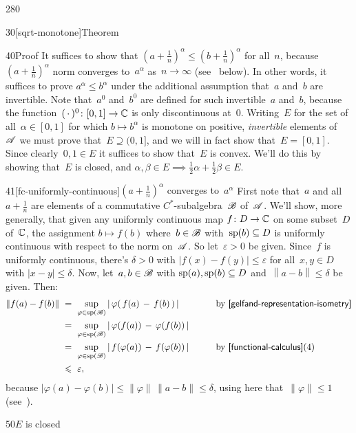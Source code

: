 \begin{parsec}{280}
\begin{point}{30}[sqrt-monotone]{Theorem}
\begin{point}{40}{Proof}
It suffices to show that
$(a+\frac{1}{n})^\alpha \leq (b+\frac{1}{n})^\alpha$
for all~$n$,
because~$(a+\frac{1}{n})^\alpha$
norm converges to~$a^\alpha$
as~$n\to\infty$ (see~ below).
In other words,
it suffices to prove $a^\alpha \leq b^\alpha$
under the additional assumption that~$a$ and~$b$ are invertible.
Note that~$a^0$ and~$b^0$ are defined for such
invertible~$a$ and~$b$,
because the
function~$(\,\cdot\,)^0\colon [0,1]\to\mathbb{C}$
is only discontinuous at~$0$.
Writing~$E$ for the set of all~$\alpha\in[0,1]$
for which $b\mapsto b^\alpha$ is monotone
on positive,
\emph{invertible} elements of~$\mathscr{A}$
we must prove that~$E\supseteq(0,1]$,
and we will in fact show that~$E=[0,1]$.
Since clearly~$0,1\in E$
it suffices to show that~$E$ is convex.
We'll do this by showing that~$E$
is closed,
and $\alpha,\beta\in E\implies \frac{1}{2}\alpha
+ \frac{1}{2}\beta \in E$.
\begin{point}{41}[fc-uniformly-continuous]{$(a+\frac{1}{n})^\alpha$
	converges to~$a^\alpha$}
First note that~$a$ and all~$a+\frac{1}{n}$
are elements of a commutative $C^*$-subalgebra~$\mathscr{B}$
of~$\mathscr{A}$.
We'll show, more generally,
that given any uniformly continuous map $f\colon D\to\mathbb{C}$
on some subset~$D$ of~$\mathbb{C}$,
the assignment $b\mapsto f(b)$
where~$b\in \mathscr{B}$ with~$\mathrm{sp}(b)\subseteq D$
is uniformly continuous
with respect to the norm on~$\mathscr{A}$.
So let~$\varepsilon>0$ be given.
Since~$f$ is uniformly continuous,
there's $\delta>0$ with $\left|f(x)-f(y)\right|\leq\varepsilon$
for all~$x,y\in D$ with $\left|x-y\right|\leq \delta$.
Now, let~$a,b\in \mathscr{B}$ with
$\mathrm{sp}(a),\mathrm{sp}(b)\subseteq D$
and~$\left\|a-b\right\|\leq \delta$ be given. Then:
\begin{alignat*}{3}
\|f(a)-f(b)\|
\ &= \ \sup_{\varphi\in \spec(\scrB)}
\left|\,\varphi(\,f(a)\,-\,f(b)\,)\,\right|\qquad
&&\text{by~\sref{gelfand-representation-isometry}}
\\
\ &=\ \sup_{\varphi\in\spec(\scrB)}\left|
\,\varphi(f(a))\,-\,\varphi(f(b))\,\right|\qquad
&&
\\
\ &=\ \sup_{\varphi\in\spec(\scrB)}\left|
\,f(\varphi(a))\,-\,f(\varphi(b))\,\right|\qquad
&&\text{by~\sref{functional-calculus}(4)}
\\
\ &\leq\ \varepsilon,
\end{alignat*}
because $\left|\varphi(a)-\varphi(b)\right|
\leq \|\varphi\|\,\|a-b\|\leq \delta$,
using here that~$\|\varphi\|\leq 1$
(see~).
\end{point}
\begin{point}{50}{$E$ is closed}

\end{point}
\end{point}
\end{point}
\end{parsec}
